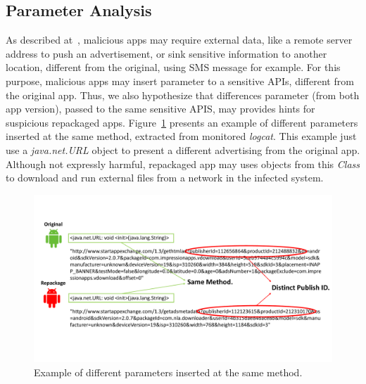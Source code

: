 \subsection{Parameter Analysis}

As described at~\cite{le2018towards}, malicious apps may require external data, like a remote server address to push an advertisement, or sink sensitive information to another location, different from the original, using SMS message for example. For this purpose, malicious apps may insert parameter to a sensitive APIs, different from the original app. Thus, we also hypothesize that differences parameter (from both app version), passed to the same sensitive APIS, may provides hints for suspicious repackaged apps. Figure~\ref{fig:parameterDiff} presents an example of different parameters inserted at the same method, extracted from monitored \textit{logcat}. This example just use a \textit{java.net.URL} object to present a different advertising from the original app. Although not expressly harmful, repackaged app may uses objects from this \textit{Class} to download and run external files from a network in the infected system\cite{DBLP:journals/compsec/ObaidatSPP22}.



\begin{figure}[t]
\centering
\includegraphics[scale=0.3]{images/parameterDiff.pdf}
\caption{Example of different parameters inserted at the same method.}
 \label{fig:parameterDiff}
\end{figure}
